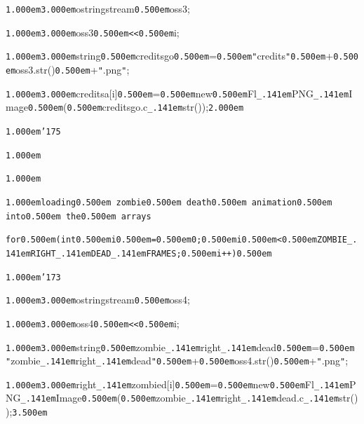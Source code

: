 \documentclass[12pt]{article}
\begin{document}
\noindent
\tt{}

\noindent
{}{\tt\mc \kern1.000em}{\tt\mc \kern3.000em}ostringstream{\tt\mc \kern0.500em}oss3;

\noindent
{}{\tt\mc \kern1.000em}{\tt\mc \kern3.000em}oss3{\tt\mc \kern0.500em}{\tt <}{\tt <}{\tt\mc \kern0.500em}i;

\noindent
{}{\tt\mc \kern1.000em}{\tt\mc \kern3.000em}string{\tt\mc \kern0.500em}creditsgo{\tt\mc \kern0.500em}={\tt\mc \kern0.500em}{\tt "}credits{\tt "}{\tt\mc \kern0.500em}+{\tt\mc \kern0.500em}oss3.str(){\tt\mc \kern0.500em}+{\tt "}.png{\tt "};

\noindent
{}{\tt\mc \kern1.000em}{\tt\mc \kern3.000em}creditsa[i]{\tt\mc \kern0.500em}={\tt\mc \kern0.500em}new{\tt\mc \kern0.500em}Fl{\tt\_\kern.141em}PNG{\tt\_\kern.141em}Image{\tt\mc \kern0.500em}({\tt\mc \kern0.500em}creditsgo.c{\tt\_\kern.141em}str());{\tt\mc \kern2.000em}

\noindent
{}{\tt\mc \kern1.000em}{\tt\char'175}

\noindent
{}{\tt\mc \kern1.000em}

\noindent
{}{\tt\mc \kern1.000em}

\noindent
{}{\tt\mc \kern1.000em}\tt\mc {\tt /}{\tt /}loading\kern0.500em zombie\kern0.500em death\kern0.500em animation\kern0.500em into\kern0.500em the\kern0.500em arrays

\noindent
\tt\mc {\tt\mc \kern1.000em}for{\tt\mc \kern0.500em}(int{\tt\mc \kern0.500em}i{\tt\mc \kern0.500em}={\tt\mc \kern0.500em}0;{\tt\mc \kern0.500em}i{\tt\mc \kern0.500em}{\tt <}{\tt\mc \kern0.500em}ZOMBIE{\tt\_\kern.141em}RIGHT{\tt\_\kern.141em}DEAD{\tt\_\kern.141em}FRAMES;{\tt\mc \kern0.500em}i++){\tt\mc \kern0.500em}

\noindent
{}{\tt\mc \kern1.000em}{\tt\char'173}

\noindent
{}{\tt\mc \kern1.000em}{\tt\mc \kern3.000em}ostringstream{\tt\mc \kern0.500em}oss4;

\noindent
{}{\tt\mc \kern1.000em}{\tt\mc \kern3.000em}oss4{\tt\mc \kern0.500em}{\tt <}{\tt <}{\tt\mc \kern0.500em}i;

\noindent
{}{\tt\mc \kern1.000em}{\tt\mc \kern3.000em}string{\tt\mc \kern0.500em}zombie{\tt\_\kern.141em}right{\tt\_\kern.141em}dead{\tt\mc \kern0.500em}={\tt\mc \kern0.500em}{\tt "}zombie{\tt\_\kern.141em}right{\tt\_\kern.141em}dead{\tt "}{\tt\mc \kern0.500em}+{\tt\mc \kern0.500em}oss4.str(){\tt\mc \kern0.500em}+{\tt "}.png{\tt "};

\noindent
{}{\tt\mc \kern1.000em}{\tt\mc \kern3.000em}right{\tt\_\kern.141em}zombied[i]{\tt\mc \kern0.500em}={\tt\mc \kern0.500em}new{\tt\mc \kern0.500em}Fl{\tt\_\kern.141em}PNG{\tt\_\kern.141em}Image{\tt\mc \kern0.500em}({\tt\mc \kern0.500em}zombie{\tt\_\kern.141em}right{\tt\_\kern.141em}dead.c{\tt\_\kern.141em}str());{\tt\mc \kern3.500em}
\end{document}
